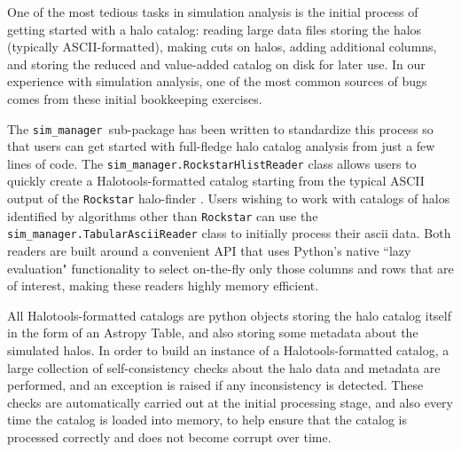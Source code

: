 \documentclass[twocolumn, tighten]{aastex6}
\newcommand{\sims}{{\tt sim\_manager }}
\begin{document}
One of the most tedious tasks in simulation analysis is the initial process of getting started with a halo catalog: reading large data files storing the halos (typically ASCII-formatted), making cuts on halos, adding additional columns, and storing the reduced and value-added catalog on disk for later use. In our experience with simulation analysis, one of the most common sources of bugs comes from these initial bookkeeping exercises. 




The \sims sub-package has been written to standardize this process so that users can get started with full-fledge halo catalog analysis from just a few lines of code. The {\tt sim\_manager.RockstarHlistReader} class allows users to quickly create a Halotools-formatted catalog starting from the typical ASCII output of the {\tt Rockstar} halo-finder \citep{behroozi_rockstar11, rockstar_trees}. Users wishing to work with catalogs of halos identified by algorithms other than {\tt Rockstar} can use the {\tt sim\_manager.TabularAsciiReader} class to initially process their ascii data. Both readers are built around a convenient API that uses Python's native ``lazy evaluation" functionality to select on-the-fly only those columns and rows that are of interest, making these readers highly memory efficient. 

All Halotools-formatted catalogs are python objects storing the halo catalog itself in the form of an Astropy Table, and also storing some metadata about the simulated halos. In order to build an instance of a Halotools-formatted catalog, a large collection of self-consistency checks about the halo data and metadata are performed, and an exception is raised if any inconsistency is detected. These checks are automatically carried out at the initial processing stage, and also every time the catalog is loaded into memory, to help ensure that the catalog is processed correctly and does not become corrupt over time. 
\end{document}
